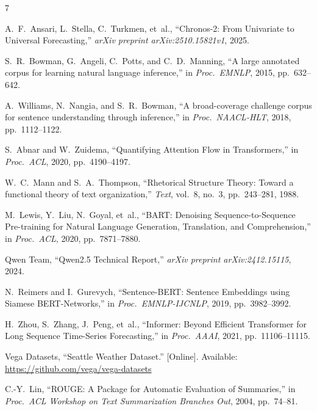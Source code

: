 \documentclass[conference]{IEEEtran}
\begin{document}
\begin{thebibliography}{7}

A.~F.~Ansari, L.~Stella, C.~Turkmen, et~al.,
``Chronos-2: From Univariate to Universal Forecasting,''
\textit{arXiv preprint arXiv:2510.15821v1}, 2025.

S.~R.~Bowman, G.~Angeli, C.~Potts, and C.~D.~Manning,
``A large annotated corpus for learning natural language inference,''
in \textit{Proc.\ EMNLP}, 2015, pp.~632--642.

A.~Williams, N.~Nangia, and S.~R.~Bowman,
``A broad-coverage challenge corpus for sentence understanding through inference,''
in \textit{Proc.\ NAACL-HLT}, 2018, pp.~1112--1122.

S.~Abnar and W.~Zuidema,
``Quantifying Attention Flow in Transformers,''
in \textit{Proc.\ ACL}, 2020, pp.~4190--4197.

W.~C.~Mann and S.~A.~Thompson,
``Rhetorical Structure Theory: Toward a functional theory of text organization,''
\textit{Text}, vol.~8, no.~3, pp.~243--281, 1988.

M.~Lewis, Y.~Liu, N.~Goyal, et~al.,
``BART: Denoising Sequence-to-Sequence Pre-training for Natural Language Generation, Translation, and Comprehension,''
in \textit{Proc.\ ACL}, 2020, pp.~7871--7880.

Qwen Team,
``Qwen2.5 Technical Report,''
\textit{arXiv preprint arXiv:2412.15115}, 2024.

N.~Reimers and I.~Gurevych,
``Sentence-BERT: Sentence Embeddings using Siamese BERT-Networks,''
in \textit{Proc.\ EMNLP-IJCNLP}, 2019, pp.~3982--3992.

H.~Zhou, S.~Zhang, J.~Peng, et~al.,
``Informer: Beyond Efficient Transformer for Long Sequence Time-Series Forecasting,''
in \textit{Proc.\ AAAI}, 2021, pp.~11106--11115.

Vega Datasets,
``Seattle Weather Dataset.''
[Online]. Available: \url{https://github.com/vega/vega-datasets}

C.-Y.~Lin,
``ROUGE: A Package for Automatic Evaluation of Summaries,''
in \textit{Proc.\ ACL Workshop on Text Summarization Branches Out}, 2004, pp.~74--81.

\end{thebibliography}
\end{document}
